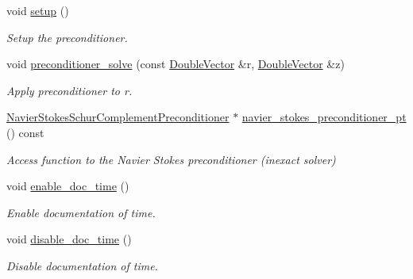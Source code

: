 \begin{DoxyCompactItemize}
void \hyperlink{classoomph_1_1FSIPreconditioner_adadfe9f4332af610b00f1f45d1ad432e}{setup} ()
\begin{DoxyCompactList}\small\item\em Setup the preconditioner. \end{DoxyCompactList}\item 
void \hyperlink{classoomph_1_1FSIPreconditioner_a31c84c3ca19c31488acd0bf2fe333a6b}{preconditioner\+\_\+solve} (const \hyperlink{classoomph_1_1DoubleVector}{Double\+Vector} \&r, \hyperlink{classoomph_1_1DoubleVector}{Double\+Vector} \&z)
\begin{DoxyCompactList}\small\item\em Apply preconditioner to r. \end{DoxyCompactList}\item 
\hyperlink{classoomph_1_1NavierStokesSchurComplementPreconditioner}{Navier\+Stokes\+Schur\+Complement\+Preconditioner} $\ast$ \hyperlink{classoomph_1_1FSIPreconditioner_a8cd1be6bffd5014090350064177c0283}{navier\+\_\+stokes\+\_\+preconditioner\+\_\+pt} () const
\begin{DoxyCompactList}\small\item\em Access function to the Navier Stokes preconditioner (inexact solver) \end{DoxyCompactList}\item 
void \hyperlink{classoomph_1_1FSIPreconditioner_a2836b05d6eb81b807bd53b50dad7d3a0}{enable\+\_\+doc\+\_\+time} ()
\begin{DoxyCompactList}\small\item\em Enable documentation of time. \end{DoxyCompactList}\item 
void \hyperlink{classoomph_1_1FSIPreconditioner_a932cb1cf6a20503a5cbb43a6b67f2340}{disable\+\_\+doc\+\_\+time} ()
\begin{DoxyCompactList}\small\item\em Disable documentation of time. \end{DoxyCompactList}\end{DoxyCompactItemize}
